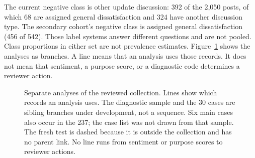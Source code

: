 \documentclass[conference,letterpaper]{IEEEtran}
\begin{document}
The current negative class is other update discussion: 392 of the 2,050 posts, of which 68 are assigned general dissatisfaction and 324 have another discussion type. The secondary cohort's negative class is assigned general dissatisfaction (456 of 542). Those label systems answer different questions and are not pooled. Class proportions in either set are not prevalence estimates. Figure~\ref{fig:design} shows the analyses as branches. A line means that an analysis uses those records. It does not mean that sentiment, a purpose score, or a diagnostic code determines a reviewer action.

\begin{figure}[t]
\centering
{}
\caption{Separate analyses of the reviewed collection. Lines show which records an analysis uses. The diagnostic sample and the 30 cases are sibling branches under development, not a sequence. Six main cases also occur in the 237; the case list was not drawn from that sample. The fresh test is dashed because it is outside the collection and has no parent link. No line runs from sentiment or purpose scores to reviewer actions.}
\label{fig:design}
\end{figure}
\end{document}

